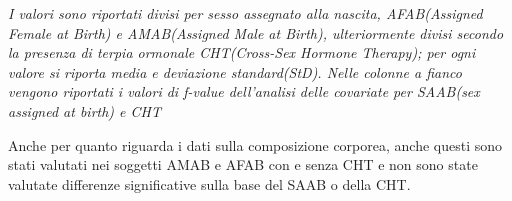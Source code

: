 \documentclass[12pt]{article}
\begin{document}
\begin{table}[H]
\centering
    \caption{Valutazione dei parametri nutrizionali}
    \vspace*{0.2em}
{\renewcommand{\arraystretch}{2}%
}
    \label{tab:my_label}
    \footnotesize \textit{I valori sono riportati divisi per sesso assegnato alla nascita, AFAB(Assigned Female at Birth) e AMAB(Assigned Male at Birth), ulteriormente divisi secondo la presenza di terpia ormonale CHT(Cross-Sex Hormone Therapy); per ogni valore si riporta media e deviazione standard(StD). Nelle colonne a fianco vengono riportati i valori di f-value dell'analisi delle covariate per SAAB(sex assigned at birth) e CHT}
\end{table}

Anche per quanto riguarda i dati sulla composizione corporea, anche questi sono stati valutati nei soggetti AMAB e AFAB con e senza CHT e non sono state valutate differenze significative sulla base del SAAB o della CHT.
\end{document}
